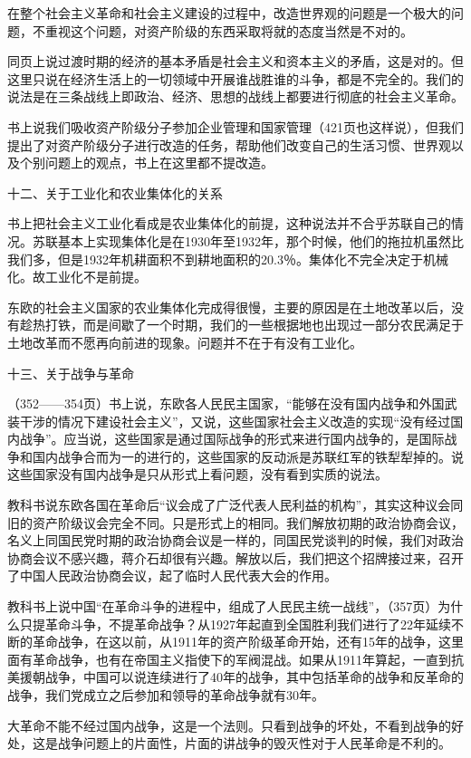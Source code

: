在整个社会主义革命和社会主义建设的过程中，改造世界观的问题是一个极大的问题，不重视这个问题，对资产阶级的东西采取将就的态度当然是不对的。

同页上说过渡时期的经济的基本矛盾是社会主义和资本主义的矛盾，这是对的。但这里只说在经济生活上的一切领域中开展谁战胜谁的斗争，都是不完全的。我们的说法是在三条战线上即政治、经济、思想的战线上都要进行彻底的社会主义革命。

书上说我们吸收资产阶级分子参加企业管理和国家管理（421页也这样说），但我们提出了对资产阶级分子进行改造的任务，帮助他们改变自己的生活习惯、世界观以及个别问题上的观点，书上在这里都不提改造。

十二、关于工业化和农业集体化的关系

书上把社会主义工业化看成是农业集体化的前提，这种说法并不合乎苏联自己的情况。苏联基本上实现集体化是在1930年至1932年，那个时候，他们的拖拉机虽然比我们多，但是1932年机耕面积不到耕地面积的20.3％。集体化不完全决定于机械化。故工业化不是前提。

东欧的社会主义国家的农业集体化完成得很慢，主要的原因是在土地改革以后，没有趁热打铁，而是间歇了一个时期，我们的一些根据地也出现过一部分农民满足于土地改革而不愿再向前进的现象。问题并不在于有没有工业化。

十三、关于战争与革命

（352——354页）书上说，东欧各人民民主国家，“能够在没有国内战争和外国武装干涉的情况下建设社会主义”，又说，这些国家社会主义改造的实现“没有经过国内战争”。应当说，这些国家是通过国际战争的形式来进行国内战争的，是国际战争和国内战争合而为一的进行的，这些国家的反动派是苏联红军的铁犁犁掉的。说这些国家没有国内战争是只从形式上看问题，没有看到实质的说法。

教科书说东欧各国在革命后“议会成了广泛代表人民利益的机构”，其实这种议会同旧的资产阶级议会完全不同。只是形式上的相同。我们解放初期的政治协商会议，名义上同国民党时期的政治协商会议是一样的，同国民党谈判的时候，我们对政治协商会议不感兴趣，蒋介石却很有兴趣。解放以后，我们把这个招牌接过来，召开了中国人民政治协商会议，起了临时人民代表大会的作用。

教科书上说中国“在革命斗争的进程中，组成了人民民主统一战线”，（357页）为什么只提革命斗争，不提革命战争？从1927年起直到全国胜利我们进行了22年延续不断的革命战争，在这以前，从1911年的资产阶级革命开始，还有15年的战争，这里面有革命战争，也有在帝国主义指使下的军阀混战。如果从1911年算起，一直到抗美援朝战争，中国可以说连续进行了40年的战争，其中包括革命的战争和反革命的战争，我们党成立之后参加和领导的革命战争就有30年。

大革命不能不经过国内战争，这是一个法则。只看到战争的坏处，不看到战争的好处，这是战争问题上的片面性，片面的讲战争的毁灭性对于人民革命是不利的。

